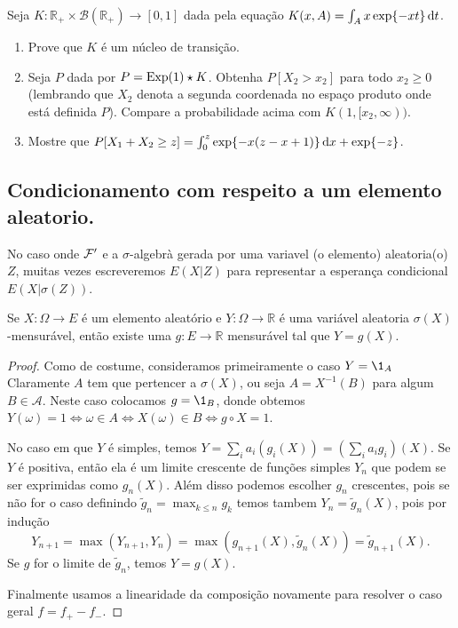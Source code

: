 \begin{exercise}
  Seja $K:\mathbb{R}_+ \times \mathcal{B}(\mathbb{R}_+) \to [0,1]$ dada pela equação $K(x,A) = \int_A x \exp\{-x t\} \mathop{}\!\mathrm{d} t$.
  \begin{enumerate}[\quad a)]
  \item Prove que $K$ \'e um n\'ucleo de transi\c{c}\~ao.
  \item Seja $P$ dada por $P = \textnormal{Exp}(1) \star K$.
    Obtenha $P[X_2 > x_2]$ para todo $x_2 \geq 0$ (lembrando que $X_2$ denota a segunda coordenada no espa\c{c}o produto onde est\'a definida $P$).
    Compare a probabilidade acima com $K(1,[x_2, \infty))$.
  \item Mostre que $P[X_1 + X_2 \geq z] = \int_0^z \exp \{-x(z-x+1)\} \mathop{}\!\mathrm{d} x + \exp\{-z\}$.
  \end{enumerate}
\end{exercise}

\vfill
\pagebreak


\subsection{Condicionamento com respeito a um elemento aleatorio.}

No caso onde ${\mathcal F}'$ e a $\sigma$-algebrà gerada por uma variavel (o elemento) aleatoria(o) $Z$, 
muitas vezes escreveremos $E(X|Z)$ para representar a esperança condicional $E(X|\sigma(Z))$.


\begin{lemma}
  \label{l:f_g_circ_X}
  Se $X: \Omega \to E$ é um elemento aleatório e $Y:\Omega \to \mathbb{R}$ é uma variável aleatoria $\sigma(X)$-mensurável, 
  então existe uma $g:E \to \mathbb{R}$ mensurável tal que $Y = g(X)$.
\end{lemma}

\begin{proof}
  Como de costume, consideramos primeiramente o caso $Y = \1_A$
  Claramente $A$ tem que pertencer a $\sigma(X)$, ou seja $A = X^{-1}(B)$ para algum $B \in \mathcal{A}$.
  Neste caso colocamos $g = \1_B$, donde obtemos $Y(\omega) = 1 \Leftrightarrow \omega \in A \Leftrightarrow X(\omega) \in B \Leftrightarrow g \circ X = 1$.

  No caso em que $Y$ é simples, temos $Y = \sum_i a_i (g_i (X)) = (\sum_i a_i g_i)(X)$.
  Se $Y$ é positiva, então ela é um limite crescente de funções simples $Y_n$ que podem se ser exprimidas como $g_n(X)$. 
  Além disso podemos escolher $g_n$ crescentes, pois se não for o caso definindo $\tilde g_n= \max_{k\le n}g_k$ temos
  tambem $Y_n=\tilde g_n(X)$, pois por indução
  \begin{equation}
    Y_{n+1} = \max(Y_{n+1}, Y_{n}) = \max(g_{n+1}(X) , \tilde g_n(X)) = \tilde g_{n+1}(X).
  \end{equation}
Se $g$ for o limite de $\tilde g_n$, temos $Y=g(X)$.

\medskip

  Finalmente usamos a linearidade da composição novamente para resolver o caso geral $f = f_+ - f_-$.
\end{proof}







